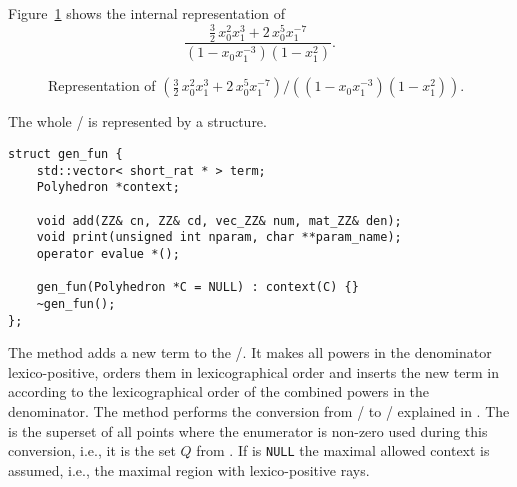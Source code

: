 \begin{example}
Figure~\ref{fig:rat}
shows the internal representation of
$$
\frac{\frac 3 2 \, x_0^2 x_1^3 + 2 \, x_0^5 x_1^{-7}}
{ (1 - x_0 x_1^{-3}) (1 - x_1^2)}
.
$$

\begin{figure}
\begin{center}
\begin{minipage}{0cm}
\end{minipage}
\end{center}
\caption{Representation of
$
\left(\frac 3 2 \, x_0^2 x_1^3 + 2 \, x_0^5 x_1^{-7}\right)
/ \left( (1 - x_0 x_1^{-3}) (1 - x_1^2)\right)
$.}
\label{fig:rat}
\end{figure}

\end{example}

The whole \rgf/ is represented by a 
structure.
\begin{verbatim}
struct gen_fun {
    std::vector< short_rat * > term;
    Polyhedron *context;

    void add(ZZ& cn, ZZ& cd, vec_ZZ& num, mat_ZZ& den);
    void print(unsigned int nparam, char **param_name);
    operator evalue *();

    gen_fun(Polyhedron *C = NULL) : context(C) {}
    ~gen_fun();
};
\end{verbatim}
The method  adds a new term to the \rgf/.
It makes all powers in the denominator lexico-positive,
orders them in lexicographical order and inserts the new
term in  according to the lexicographical
order of the combined powers in the denominator.
The method  performs
the conversion from \rgf/ to \psp/ explained in 
.
The   is the superset
of all points where the enumerator is non-zero used during this conversion,
i.e., it is the set $Q$ from .
If   is \verb+NULL+ the maximal
allowed context is assumed, i.e., the maximal
region with lexico-positive rays.  

